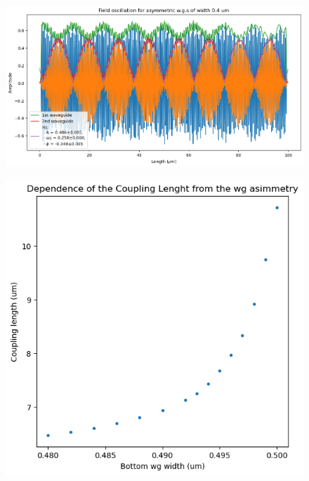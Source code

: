 \begin{figure}[H]
    \centering
    \includegraphics[width=0.8\linewidth]{Figures/wg_field_asymm.png}
    \caption{}
    \label{fig:wg_field_asymm}
\end{figure}

\begin{figure}[H]
    \centering
    \includegraphics[width=0.6\linewidth]{Figures/wg_coupling_vs_asymm.png}
    \caption{}
    \label{fig:wg_coupling_vs_asymm}
\end{figure}